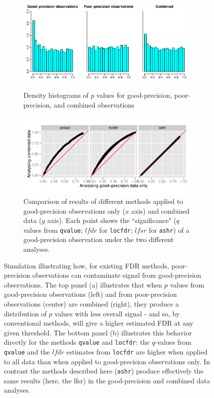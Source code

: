 \documentclass[11pt]{article}
\def\lfdr{\textit{lfdr}}
\def\lfsr{\textit{lfsr}}
\def\qvalue{{\tt qvalue}\xspace}
\def\locfdr{{\tt locfdr}\xspace}
\def\ashr{{\tt ashr}\xspace}
\begin{document}
\begin{figure}
\begin{subfigure}{\textwidth}
\centering\includegraphics[width=4in]{../analysis/figure/make_GOODPOOR_figs.Rmd/GOODPOOReg_hist-1.pdf} 
    \label{fig:goodpoor-hist}
    \caption{Density histograms of $p$ values for good-precision, poor-precision, and combined observations}
 \end{subfigure}
\begin{subfigure}{\textwidth}
\centering\includegraphics[width=4in]{../analysis/figure/make_GOODPOOR_figs.Rmd/GOODPOOReg_scatter-1.pdf}
    \caption{Comparison of results of different methods applied to good-precision observations only ($x$ axis) and combined data ($y$ axis). Each point shows the ``significance" ($q$ values from \qvalue; $\lfdr$ for \locfdr; $\lfsr$ for \ashr) of a good-precision observation under the two different analyses.} \label{fig:goodpoor-scatter}
\end{subfigure}
\caption{Simulation illustrating how, for existing FDR methods, 
poor-precision observations can contaminate signal from good-precision observations. The top panel (a) illustrates that when 
$p$ values from good-precision observations (left) and from poor-precision observations (center) are combined (right), they produce
a distribution of $p$ values with less overall signal - and so, by conventional methods, will give a higher estimated FDR at any given threshold.
The bottom panel (b) illustrates this behavior directly for the methods \qvalue and \locfdr: the $q$-values from \qvalue and the $\lfdr$ estimates from \locfdr are higher when applied to all data than when applied to good-precision observations only. In contrast the methods described here (\ashr) produce effectively the same results (here, the lfsr) in the good-precision and combined data analyses.} \label{fig:goodpoor}
\end{figure}
\end{document}
